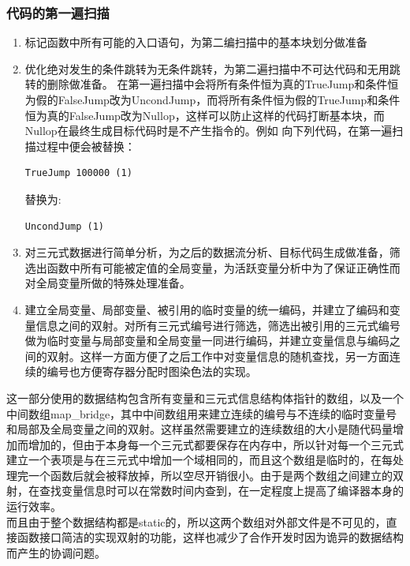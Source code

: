 \documentclass[12pt,a4paper,Flow]{report}
\begin{document}
\subsubsection{代码的第一遍扫描}
\begin{enumerate}
\item \leavevmode 标记函数中所有可能的入口语句，为第二编扫描中的基本块划分做准备
\item \leavevmode 优化绝对发生的条件跳转为无条件跳转，为第二遍扫描中不可达代码和无用跳转的删除做准备。
  在第一遍扫描中会将所有条件恒为真的TrueJump和条件恒为假的FalseJump改为UncondJump，而将所有条件恒为假的TrueJump和条件恒为真的FalseJump改为Nullop，这样可以防止这样的代码打断基本块，而Nullop在最终生成目标代码时是不产生指令的。例如  向下列代码，在第一遍扫描过程中便会被替换：
\begin{verbatim}
TrueJump 100000 (1)
\end{verbatim}
替换为:
\begin{verbatim}
UncondJump (1)
\end{verbatim}
\item \leavevmode 对三元式数据进行简单分析，为之后的数据流分析、目标代码生成做准备，筛选出函数中所有可能被定值的全局变量，为活跃变量分析中为了保证正确性而对全局变量所做的特殊处理准备。
\item \leavevmode 建立全局变量、局部变量、被引用的临时变量的统一编码，并建立了编码和变量信息之间的双射。对所有三元式编号进行筛选，筛选出被引用的三元式编号做为临时变量与局部变量和全局变量一同进行编码，并建立变量信息与编码之间的双射。这样一方面方便了之后工作中对变量信息的随机查找，另一方面连续的编号也方便寄存器分配时图染色法的实现。
\end{enumerate}
\indent 这一部分使用的数据结构包含所有变量和三元式信息结构体指针的数组，以及一个中间数组map\_bridge，其中中间数组用来建立连续的编号与不连续的临时变量号和局部及全局变量之间的双射。这样虽然需要建立的连续数组的大小是随代码量增加而增加的，但由于本身每一个三元式都要保存在内存中，所以针对每一个三元式建立一个表项是与在三元式中增加一个域相同的，而且这个数组是临时的，在每处理完一个函数后就会被释放掉，所以空尽开销很小。由于是两个数组之间建立的双射，在查找变量信息时可以在常数时间内查到，在一定程度上提高了编译器本身的运行效率。\\
\indent 而且由于整个数据结构都是static的，所以这两个数组对外部文件是不可见的，直接函数接口简洁的实现双射的功能，这样也减少了合作开发时因为诡异的数据结构而产生的协调问题。
\end{document}
